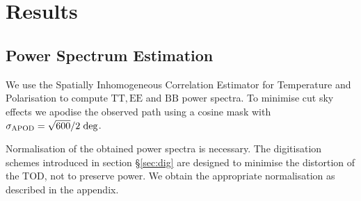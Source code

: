 \documentclass[apj]{emulateapj}
\begin{document}



\section{Results}
\label{sec:results}

\subsection{Power Spectrum Estimation}
\label{subsec:psestimation}

We use the Spatially Inhomogeneous Correlation Estimator for Temperature and Polarisation \citep[PolSpice;][]{polspice} to compute $\mathrm{TT}, \mathrm{EE}$ and $\mathrm{BB}$ power spectra. To minimise cut sky effects we apodise the observed path using a cosine mask with $\sigma_{\mathrm{APOD}} = \sqrt{600}/2 \hspace{0.7ex} \mathrm{deg}$. %


Normalisation of the obtained power spectra is necessary. The digitisation schemes introduced in section \S\ref{sec:dig} are designed to minimise the distortion of the TOD, not to preserve power. We obtain the appropriate normalisation as described in the appendix.

\end{document}
